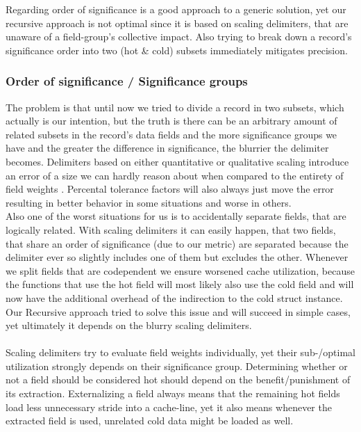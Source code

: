 Regarding order of significance is a good approach to a generic solution, yet our recursive approach is not optimal since it is based on scaling delimiters, that are unaware of a field-group's collective impact. Also trying to break down a record's significance order into two (hot \& cold) subsets immediately mitigates precision.

\subsubsection{Order of significance / Significance groups}\label{sig_groups}
The problem is that until now we tried to divide a record in two subsets, which actually is our intention, but the truth is there can be an arbitrary amount of related subsets in the record's data fields and the more significance groups we have and the greater the difference in significance, the blurrier the delimiter becomes. Delimiters based on either quantitative or qualitative scaling introduce an error of a size we can hardly reason about when compared to the entirety of field weights . Percental tolerance factors will also always just move the error resulting in better behavior in some situations and worse in others.\\
Also one of the worst situations for us is to accidentally separate fields, that are logically related. With scaling delimiters it can easily happen, that two fields, that share an order of significance (due to our metric) are separated because the delimiter ever so slightly includes one of them but excludes the other. Whenever we split fields that are codependent we ensure worsened cache utilization, because the functions that use the hot field will most likely also use the cold field and will now have the additional overhead of the indirection to the cold struct instance. Our Recursive approach tried to solve this issue and will succeed in simple cases, yet ultimately it depends on the blurry scaling delimiters.\\\\
Scaling delimiters try to evaluate field weights individually, yet their sub-/optimal utilization strongly depends on their significance group. Determining whether or not a field should be considered hot should depend on the benefit/punishment of its extraction. Externalizing a field always means that the remaining hot fields load less unnecessary stride into a cache-line, yet it also means whenever the extracted field is used, unrelated cold data might be loaded as well.\\
